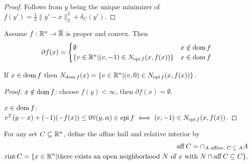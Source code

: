 \begin{proof}
  Follows from $y$ being the unique minimizer of $f(y') = \frac{1}{2}
  \| y' - x \|_{2}^{2} + \delta_{C}(y')$.
\end{proof}

\begin{thm}
  \label{sec:subgradients-8}
  Assume $f: \mathbb{R}^{n} \rightarrow \overline {\mathbb{R}}$ is proper and convex.
  Then
  \begin{equation}
    \label{eq:14}
    \partial f(x) =
    \begin{cases}
      \emptyset & x \notin \operatorname*{dom} f \\
      \{ v \in \mathbb{R}^{n} | (v, -1) \in N_{\operatorname*{epi} f}(x, f(x)) \} & x \in
      \operatorname*{dom} f
    \end{cases}
  \end{equation}

  If $x \in \operatorname*{dom} f$ then $N_{\operatorname*{dom} f}(x) = \{ v \in \mathbb{R}^{n} | (v, 0) \in
  N_{\operatorname*{epi} f}(x, f(x)) \} $.
\end{thm}

\begin{proof}
  $x \notin \operatorname*{dom} f$: choose $f(y) < \infty$, then $\partial f(x) =
  \emptyset$.

  $x \in \operatorname*{dom} f$: $v^{T}(y-x) + (-1)(- f(x)) \leq 0 \forall (y,
  \alpha) \in \operatorname*{epi} f \iff (v, -1) \in N_{\operatorname*{epi} f}(x, f(x))$.
\end{proof}

\begin{defn}
  \label{sec:subgradients-10}
  For any set $C \subseteq \mathbb{R}^{n}$, define the affine hull and relative
  interior by
  \begin{align}
    \label{eq:15}
    \operatorname*{aff} C = \cap_{\text{$A$ affine, $C \subseteq A$}} A \\
    \operatorname*{rint} C = \{ x \in \mathbb{R}^{n} | \text{there exists an open
      neighborhood $N$ of $x$ with $N \cap \operatorname*{aff} C \subseteq C$} \}.
    \label{eq:16}
  \end{align}
\end{defn}

